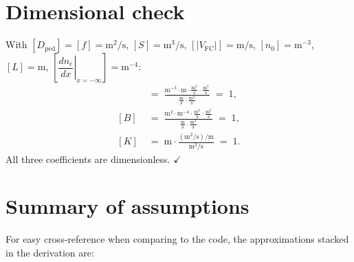 \documentclass[11pt]{article}
\renewcommand{\ne}{n_{e}}  %
\newcommand{\Vfc}{\lvert V_{\mathrm{FC}}\rvert}
\newcommand{\Sreact}{S}
\newcommand{\Dped}{D_{\mathrm{ped}}}
\newcommand{\neginf}{x=-\infty}
\newcommand{\dneneg}{\left.\dfrac{d\ne}{dx}\right|_{\neginf}}
\begin{document}
\section{Dimensional check}
\label{sec:dimcheck}

With $[\Dped]=[f]=\mathrm{m^{2}/s}$, $[\Sreact]=\mathrm{m^{3}/s}$,
$[\Vfc]=\mathrm{m/s}$, $[n_{0}]=\mathrm{m^{-3}}$, $[L]=\mathrm{m}$,
$[\dneneg]=\mathrm{m^{-4}}$:
\begin{align}
  [A] \;&=\; \frac{\mathrm{m^{-3}}\cdot\mathrm{m}\cdot\tfrac{\mathrm{m^{2}}}{\mathrm{s}}\cdot\tfrac{\mathrm{m^{3}}}{\mathrm{s}}}
                   {\tfrac{\mathrm{m}}{\mathrm{s}}\cdot\tfrac{\mathrm{m^{2}}}{\mathrm{s}}}
               \;=\; 1, \\[4pt]
  [B] \;&=\; \frac{\mathrm{m^{2}}\cdot\mathrm{m^{-4}}\cdot\tfrac{\mathrm{m^{2}}}{\mathrm{s}}\cdot\tfrac{\mathrm{m^{3}}}{\mathrm{s}}}
                   {\tfrac{\mathrm{m}}{\mathrm{s}}\cdot\tfrac{\mathrm{m^{2}}}{\mathrm{s}}}
               \;=\; 1, \\[4pt]
  [K] \;&=\; \mathrm{m}\cdot\frac{(\mathrm{m^{2}/s})/\mathrm{m}}{\mathrm{m^{2}/s}}
               \;=\; 1.
\end{align}
All three coefficients are dimensionless.  \hfill$\checkmark$

\section{Summary of assumptions}
\label{sec:assumptions}

For easy cross-reference when comparing to the code, the approximations
stacked in the derivation are:
\end{document}
